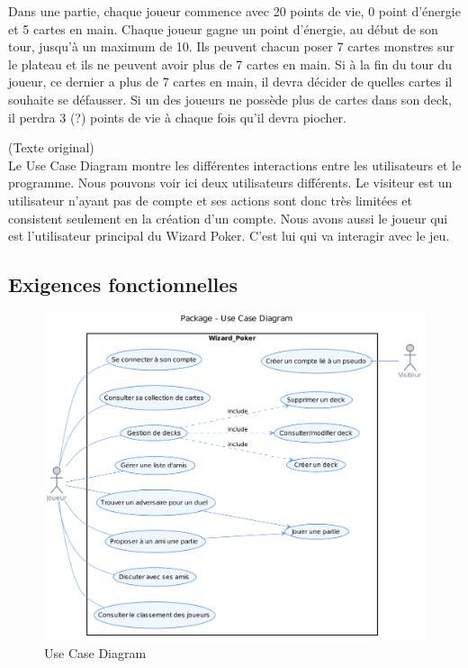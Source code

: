 \documentclass[11pt,a4paper]{article}
\begin{document}
Dans une partie, chaque joueur commence avec 20 points de vie, 0 point d'énergie et 5 cartes en main. Chaque joueur gagne un point d'énergie, au début de son tour, jusqu'à un maximum de 10.
Ils peuvent chacun poser 7 cartes monstres sur le plateau et ils ne peuvent avoir plus de 7 cartes en main. Si à la fin du tour du joueur, ce dernier a plus de 7 cartes en main, il devra décider de quelles cartes il souhaite se défausser.
Si un des joueurs ne possède plus de cartes dans son deck, il perdra 3 (?) points de vie à chaque fois qu'il devra piocher.



(Texte original)\\
Le Use Case Diagram montre les différentes interactions entre les
utilisateurs et le programme.  Nous pouvons voir ici deux utilisateurs
différents.  Le visiteur est un utilisateur n'ayant pas de compte et ses
actions sont donc très limitées et consistent seulement en la création d'un compte.
Nous avons aussi le joueur qui est l'utilisateur principal du Wizard Poker.
C'est lui qui va interagir avec le jeu.

\subsection{Exigences fonctionnelles}
\label{sec:exi-fonc}
\begin{figure}[ht]
  \centering
  \includegraphics[width=1\textwidth]{../uml_files/UseCaseDiagram.png}
  \caption{\label{fig:usecasebesoin} Use Case Diagram}
\end{figure}
\end{document}

